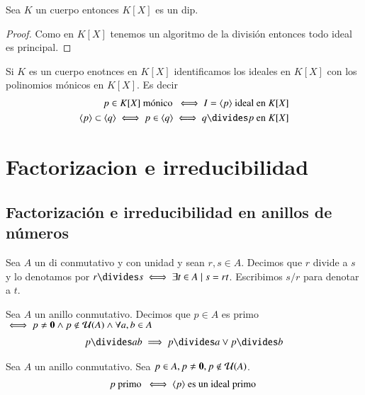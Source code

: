 \begin{pro}
	Sea $K$ un cuerpo entonces $K[X]$ es un \gls{dip}.
\end{pro}

\begin{proof}
	Como en $K[X]$ tenemos un algoritmo de la división entonces todo ideal es principal.
\end{proof}

\begin{cor}
	Si $K$ es un cuerpo enotnces en $K[X]$ identificamos los ideales en $K[X]$ con los polinomios mónicos en $K[X]$. Es decir
	\begin{align*}
		p \in K[X] \text{ mónico } \iff I = \gen{p} \text{ ideal en } K[X] \\
		\gen{p} \subset \gen{q} \iff p \in \gen{q} \iff q \divides p \text{ en } K[X]
	\end{align*}
\end{cor}

\section{Factorizacion e irreducibilidad}

\subsection{Factorización e irreducibilidad en anillos de números}

\begin{dfn}[Divisibilidad]
	Sea $A$ un \gls{di} conmutativo y con unidad y sean $r,s \in A$. Decimos que $r$ divide a $s$ y lo denotamos por $r \divides s \iff \exists t \in A \mid s = rt$. Escribimos $s/r$ para denotar a $t$.
\end{dfn}

\begin{dfn}[Primo] %
	Sea $A$ un anillo conmutativo. Decimos que $p \in A$ es primo $\iff p \neq \mathbf{0} \land p \notin \mathcal{U}(A) \land \forall a,b \in A$
	\begin{align*}
	p \divides ab \implies p \divides a \lor p \divides b
	\end{align*}
\end{dfn}

\begin{pro}
	Sea $A$ un anillo conmutativo. Sea $p \in A, p \neq \mathbf{0}, p \notin \mathcal{U}(A)$.
	\begin{align*}
	p \text{ primo } \iff \langle p\rangle \text{ es un ideal primo }
	\end{align*}
\end{pro}

